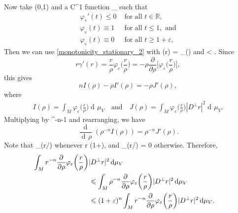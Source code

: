 \documentclass[a4paper, 11pt]{article}
\theoremstyle{plain}
\theoremstyle{definition}
\theoremstyle{remark}
\DeclareMathOperator{\diff}{d \!}
\numberwithin{equation}{subsection}
\def\({}
\def\){}
\begin{document}
Now take \(\varepsilon \in (0,1)\) and a \(C^1\) function \(\varphi_{\varepsilon} \vcentcolon {} \rightarrow [0,1]\) such that
\begin{align}
\varphi_{\varepsilon}'(t) \leqslant 0 &\text{ for all } t \in \mathbb{R}, \\ \varphi_{\varepsilon}(t) \equiv 1 &\text{ for all } t \leqslant 1, \text{ and}  \\ \varphi_{\varepsilon}(t) \equiv 0 &\text{ for all } t \geqslant 1 + \varepsilon,
\end{align}
Then we can use \eqref{monotonicity_stationary_2} with \(\gamma(r) = \varphi_{\varepsilon}\Bigl(\Bigr)\) and \(\rho < \). Since
\begin{equation}
r\gamma'(r) = \frac{r}{\rho}\varphi_{\varepsilon}\biggl(\frac{r}{\rho}\biggr) = -\rho \frac{\partial}{\partial\rho}\biggl[\varphi_{\varepsilon}\biggl(\frac{r}{\rho}\biggr)\biggr],
\end{equation}
this gives
\begin{equation}
nI(\rho) - \rho I'(\rho) = -\rho J'(\rho),
\end{equation}
where
\begin{gather}
I(\rho) = \int_{M}\varphi_{\varepsilon}\biggl(\frac{r}{\rho}\biggr) \diff\mu_{V} \quad \text{and} \quad J(\rho) = \int_{M}\varphi_{\varepsilon}\biggl(\frac{r}{\rho}\biggr)|D^{\perp}r|^2 \diff\mu_{V}.
\end{gather}
Multiplying by \(\rho^{-n-1}\) and rearranging, we have
\begin{equation}
\label{monotonicity_stationary_3}
\frac{\!\diff}{\diff\rho}(\rho^{-n}I(\rho)) = \rho^{-n}J'(\rho).
\end{equation}
Note that \(\frac{\partial}{\partial\rho}\varphi_{\varepsilon}(r/\rho) \) whenever \(\rho \leqslant r \leqslant (1+\varepsilon)\rho\), and \(\frac{\partial}{\partial\rho}\varphi_{\varepsilon}(r/\rho) = 0\) otherwise. Therefore,
\begin{align}
\int_{M}r^{-n}\frac{\partial}{\partial\rho}\varphi_{\varepsilon}\biggl(\frac{r}{\rho}\biggr) \vert D^{\perp}r \vert^{2} \diff\mu_{V} \hspace{-50pt} \\
&\leqslant \int_{M}\rho^{-n}\frac{\partial}{\partial\rho}\varphi_{\varepsilon}\biggl(\frac{r}{\rho}\biggr) \vert D^{\perp}r \vert^{2} \diff\mu_{V} \\
&\leqslant (1+\varepsilon)^n\int_{M}r^{-n}\frac{\partial}{\partial\rho}\varphi_{\varepsilon}\biggl(\frac{r}{\rho}\biggr) \vert D^{\perp}r \vert^{2} \diff\mu_{V}.
\end{align}
\end{document}
